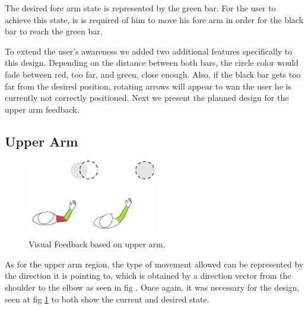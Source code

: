 The desired fore arm state is represented by the green bar. For the user to achieve this state, is is required of him to move his fore arm in order for the black bar to reach the green bar.


To extend the user's awareness we added two additional features specifically to this design. Depending on the distance between both bars, the circle color would fade between red, too far, and green, close enough. Also, if the black bar gets too far from the desired position, rotating arrows will appear to wan the user he is currently not correctly positioned. Next we present the planned design for the upper arm feedback.


\subsection{Upper Arm}

\begin{figure}[!t]
    \begin{center}
        \includegraphics[width=0.5\textwidth]{imgs/upperarmfeedback.png}
    \end{center}
    \caption{Visual Feedback based on upper arm.}
    \label{fig:upperarmfeedback}
\end{figure}

As for the upper arm region, the type of movement allowed can be represented by the direction it is pointing to, which is obtained by a direction vector from the shoulder to the elbow as seen in fig .
Once again, it was necessary for the design, seen at fig \ref{fig:upperarmfeedback} to both show the current and desired state. 


